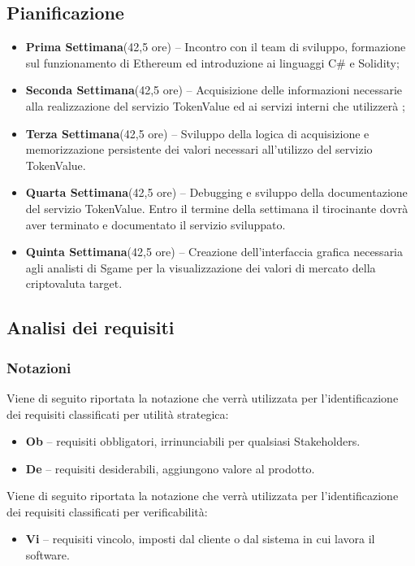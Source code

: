 \documentclass[11pt]{thesistemp}
\begin{document}
\subsection{Pianificazione}

\begin{itemize}
	\item \textbf{Prima Settimana}(42,5 ore) – Incontro con il team di sviluppo, formazione sul funzionamento di Ethereum ed introduzione ai linguaggi C\# e Solidity;
	\item \textbf{Seconda Settimana}(42,5 ore) – Acquisizione delle informazioni necessarie alla realizzazione del servizio TokenValue ed ai servizi interni che utilizzerà ;
	\item \textbf{Terza Settimana}(42,5 ore) – Sviluppo della logica di acquisizione e memorizzazione persistente dei valori necessari all’utilizzo del servizio TokenValue.
	\item \textbf{Quarta Settimana}(42,5 ore) – Debugging e sviluppo della documentazione del servizio TokenValue. Entro il termine della settimana il tirocinante dovrà aver terminato e documentato il servizio sviluppato.
	\item \textbf{Quinta Settimana}(42,5 ore) – Creazione dell’interfaccia grafica necessaria agli analisti di Sgame per la visualizzazione dei valori di mercato della criptovaluta target.
\end{itemize}
\pagebreak

\subsection{Analisi dei requisiti}

\subsubsection{Notazioni}

Viene di seguito riportata la notazione che verrà utilizzata per l’identificazione dei requisiti classificati per utilità strategica: 
\begin{itemize}
	\item \textbf{Ob} – requisiti obbligatori, irrinunciabili per qualsiasi Stakeholders.
	\item \textbf{De} – requisiti desiderabili, aggiungono valore al prodotto.
\end{itemize}
Viene di seguito riportata la notazione che verrà utilizzata per l’identificazione dei requisiti classificati per verificabilità: 
\begin{itemize}
	\item \textbf{Vi} – requisiti vincolo, imposti dal cliente o dal sistema in cui lavora il software.
\end{itemize}
\end{document}
